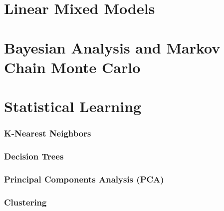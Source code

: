 \documentclass[english]{article}
\begin{document}
\begin{multicols*}{2}
\newpage
\part{Linear Mixed Models}\label{part:LMM}




\newpage
\part{Bayesian Analysis and Markov Chain Monte Carlo}\label{part:BAandMCMC}




\newpage
\part{Statistical Learning}\label{part:statLearn}
\section{K-Nearest Neighbors}\label{sec:KNN}


\newpage
\section{Decision Trees}


\newpage
\section{Principal Components Analysis (PCA)}\label{sec:PCA}


\newpage
\section{Clustering}





\end{multicols*}
\end{document}
